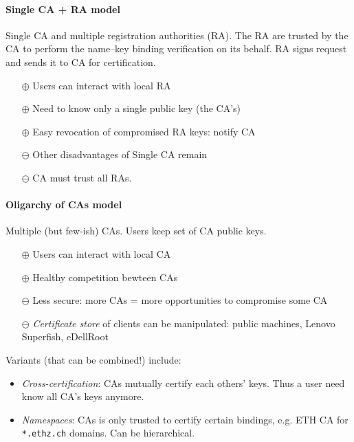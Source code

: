 \paragraph{Single CA + RA model} Single CA and multiple registration authorities (RA). The RA are trusted by the CA to perform the name--key binding verification on its behalf. RA signs request and sends it to CA for certification.
\begin{itemize}
    \item[$\oplus$] Users can interact with local RA
    \item[$\oplus$] Need to know only a single public key (the CA's)
    \item[$\oplus$] Easy revocation of compromised RA keys: notify CA
    \item[$\ominus$] Other disadvantages of Single CA remain
    \item[$\ominus$] CA must trust all RAs.
\end{itemize}

\paragraph{Oligarchy of CAs model} Multiple (but few-ish) CAs. Users keep set of CA public keys.
\begin{itemize}
    \item[$\oplus$] Users can interact with local CA
    \item[$\oplus$] Healthy competition bewteen CAs
    \item[$\ominus$] Less secure: more CAs = more opportunities to compromise some CA
    \item[$\ominus$] \emph{Certificate store} of clients can be manipulated: public machines, Lenovo Superfish, eDellRoot
\end{itemize}

Variants (that can be combined!) include:
\begin{itemize}
    \item \emph{Cross-certification}: CAs mutually certify each others' keys. Thus a user need know all CA's keys anymore.
    \item \emph{Namespaces}: CAs is only trusted to certify certain bindings, e.g. ETH CA for \texttt{*.ethz.ch} domains. Can be hierarchical.
\end{itemize}

